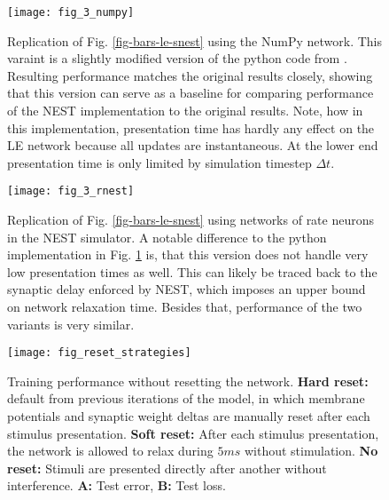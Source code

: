 \renewcommand{\thefigure}{S\arabic{figure}}
\begin{figure}[h!]
  \centering
  \texttt{[image: fig\_3\_numpy]}
  \caption[Replication of Fig. \ref{fig-bars-le-snest} using the NumPy network]{Replication of Fig.
    \ref{fig-bars-le-snest} using the NumPy network. This varaint is a slightly modified version of the python code from
    \citep{Haider2021}. Resulting performance matches the original results closely, showing that this version can serve
    as a baseline for comparing performance of the NEST implementation to the original results. Note, how in this
    implementation, presentation time has hardly any effect on the LE network because all updates are instantaneous. At
    the lower end presentation time is only limited by simulation timestep $\Delta t$.}
  \label{fig-bars-le-numpy}
\end{figure}


\begin{figure}[h!]
  \centering
  \texttt{[image: fig\_3\_rnest]}
  \caption[Replication of Fig. \ref{fig-bars-le-snest} using networks of rate neurons in the NEST simulator]{Replication
    of Fig. \ref{fig-bars-le-snest} using networks of rate neurons in the NEST simulator. A notable difference to the
    python implementation in Fig. \ref{fig-bars-le-numpy} is, that this version does not handle very low presentation
    times as well. This can likely be traced back to the synaptic delay enforced by NEST, which imposes an upper bound
    on network relaxation time. Besides that, performance of the two variants is very similar.}
  \label{fig-bars-le-rnest}
\end{figure}


\begin{figure}[h!]
  \centering
  \texttt{[image: fig\_reset\_strategies]}
  \caption[Training performance without resetting the network.]{Training performance without resetting the network.
    \textbf{Hard reset:} default from previous iterations of the model, in which membrane potentials and synaptic weight
    deltas are manually reset after each stimulus presentation. \textbf{Soft reset:} After each stimulus presentation, the
    network is allowed to relax during $5ms$ without stimulation. \textbf{No reset:} Stimuli are presented directly after
    another without interference. \textbf{A:} Test error, \textbf{B:} Test loss. }
  \label{fig-reset-strategies}
\end{figure}




